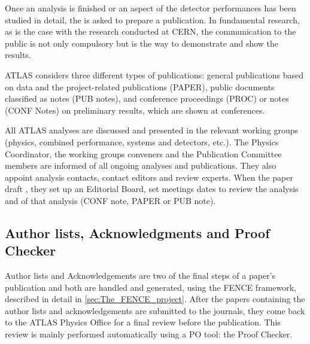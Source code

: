 Once an analysis is finished or an aspect of the detector performances has been studied in detail,
the  is asked to prepare a publication.
In fundamental research, as is the case with the research conducted at CERN, the communication to the public is not only compulsory but is the  way to demonstrate and show the results.

ATLAS considers three different types of publications: general publications based on data and the project-related publications (PAPER), public documents classified as notes (PUB notes), and conference proceedings (PROC) or notes (CONF Notes) on preliminary results, which are shown at conferences.

All ATLAS analyses are discussed and presented in the relevant working groups  (physics, combined performance, systems and detectors, etc.). The Physics Coordinator, the working groups conveners and the Publication Committee members are informed of all ongoing analyses and publications. They also appoint analysis contacts, contact editors\GSnote{}{,} and review experts.
When the paper draft ,
they set up an Editorial Board, set meetings dates to review the analysis and  of that analysis (CONF note, PAPER or PUB note). 


\subsection{Author lists, Acknowledgments and Proof Checker}%
\label{sec:Authorlists_acknowledgments_and_ProofChecker}

Author lists and Acknowledgements are two of the final steps of a paper’s publication and both are handled and generated, using the FENCE framework, described in detail in \cref{sec:The_FENCE_project}.
After the papers containing the author lists and acknowledgements are submitted to the journals,
they come back to the ATLAS Physics Office for a final review before the publication.
This review is mainly performed automatically using a PO tool: the Proof Checker.

